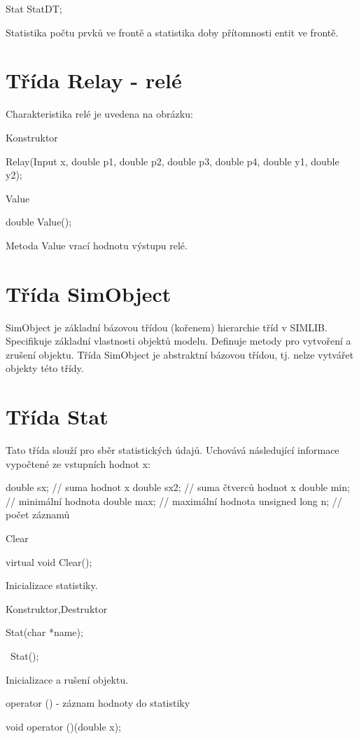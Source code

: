 \documentclass[a4paper]{article}
\begin{document}
  Stat StatDT;


Statistika počtu prvků ve frontě a statistika doby přítomnosti entit
ve frontě.

\section{Třída Relay - relé}

Charakteristika relé je uvedena na obrázku:


Konstruktor

  Relay(Input x, double p1, double p2, double p3, double p4, double  y1,
  double y2);


Value

  double Value();


Metoda Value vrací hodnotu výstupu relé.

\section{Třída SimObject}

SimObject je základní bázovou třídou (kořenem) hierarchie tříd v
SIMLIB. Specifikuje základní vlastnosti objektů modelu. Definuje
metody pro vytvoření a zrušení objektu. Třída SimObject je
abstraktní bázovou třídou, tj. nelze vytvářet objekty této třídy.

\section{Třída Stat}

Tato třída slouží pro sběr statistických údajů. Uchovává následující
informace vypočtené ze vstupních hodnot x:

  double sx;       // suma hodnot x
  double sx2;      // suma čtverců hodnot x
  double min;      // minimální hodnota
  double max;      // maximální hodnota
  unsigned long n; // počet záznamů



Clear

  virtual void Clear();


Inicializace statistiky.


Konstruktor,Destruktor

  Stat(char *name);

  ~Stat();


Inicializace a rušení objektu.


operator () - záznam hodnoty do statistiky

  void operator ()(double x);
\end{document}
